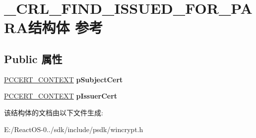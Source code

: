 \hypertarget{struct___c_r_l___f_i_n_d___i_s_s_u_e_d___f_o_r___p_a_r_a}{}\section{\+\_\+\+C\+R\+L\+\_\+\+F\+I\+N\+D\+\_\+\+I\+S\+S\+U\+E\+D\+\_\+\+F\+O\+R\+\_\+\+P\+A\+R\+A结构体 参考}
\label{struct___c_r_l___f_i_n_d___i_s_s_u_e_d___f_o_r___p_a_r_a}
\subsection*{Public 属性}
\begin{DoxyCompactItemize}
\item 
\mbox{\label{struct___c_r_l___f_i_n_d___i_s_s_u_e_d___f_o_r___p_a_r_a_af8d606688db40b087103d15df839c43b}} 
\hyperlink{struct___c_e_r_t___c_o_n_t_e_x_t}{P\+C\+C\+E\+R\+T\+\_\+\+C\+O\+N\+T\+E\+XT} {\bfseries p\+Subject\+Cert}
\item 
\mbox{\label{struct___c_r_l___f_i_n_d___i_s_s_u_e_d___f_o_r___p_a_r_a_a41197ce604454fa9e69f036b076fbc43}} 
\hyperlink{struct___c_e_r_t___c_o_n_t_e_x_t}{P\+C\+C\+E\+R\+T\+\_\+\+C\+O\+N\+T\+E\+XT} {\bfseries p\+Issuer\+Cert}
\end{DoxyCompactItemize}


该结构体的文档由以下文件生成\+:\begin{DoxyCompactItemize}
\item 
E\+:/\+React\+O\+S-\/0../sdk/include/psdk/wincrypt.\+h\end{DoxyCompactItemize}
